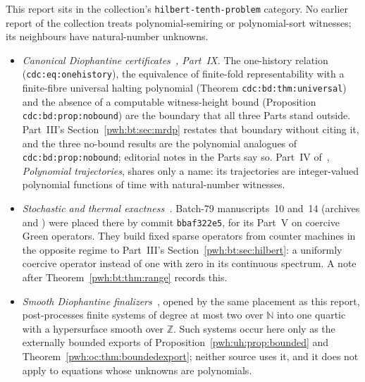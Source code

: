 \documentclass[11pt,letterpaper]{article}
\numberwithin{equation}{section}
\theoremstyle{definition}
\newcommand{\N}{\mathbb N}
\newcommand{\Z}{\mathbb Z}
\begin{document}
This report sits in the collection's \texttt{hilbert-tenth-problem}
category. No earlier report of the collection treats polynomial-semiring or
polynomial-sort witnesses; its neighbours have natural-number unknowns.
\begin{itemize}
\item \emph{Canonical Diophantine certificates~\cite{cdc}, Part~IX.} The
one-history relation (\texttt{cdc:eq:onehistory}), the equivalence of
finite-fold representability with a finite-fibre universal halting
polynomial (Theorem \texttt{cdc:bd:thm:universal}) and the absence of a
computable witness-height bound (Proposition \texttt{cdc:bd:prop:nobound})
are the boundary that all three Parts stand outside. Part~III's
Section~\ref{pwh:bt:sec:mrdp} restates that boundary without citing it,
and the three no-bound results are the polynomial analogues of
\texttt{cdc:bd:prop:nobound}; editorial notes in the Parts say so.
Part~IV of~\cite{cdc}, \emph{Polynomial trajectories}, shares only a name:
its trajectories are integer-valued polynomial functions of time with
natural-number witnesses.
\item \emph{Stochastic and thermal exactness~\cite{ste}.} Batch-79
manuscripts~10 and~14 (archives  and
) were placed there by
commit \texttt{bbaf322e5}, for its Part~V on coercive Green operators. They
build fixed sparse operators from counter machines in the opposite regime
to Part~III's Section~\ref{pwh:bt:sec:hilbert}: a uniformly coercive operator
instead of one with zero in its continuous spectrum. A note after
Theorem~\ref{pwh:bt:thm:range} records this.
\item \emph{Smooth Diophantine finalizers~\cite{sdf}}, opened by the same
placement as this report, post-processes finite systems of degree at most
two over $\N$ into one quartic with a hypersurface smooth over $\Z$. Such
systems occur here only as the externally bounded exports of
Proposition~\ref{pwh:uh:prop:bounded} and
Theorem~\ref{pwh:oc:thm:boundedexport}; neither source uses it, and it does
not apply to equations whose unknowns are polynomials.
\end{itemize}
\end{document}
